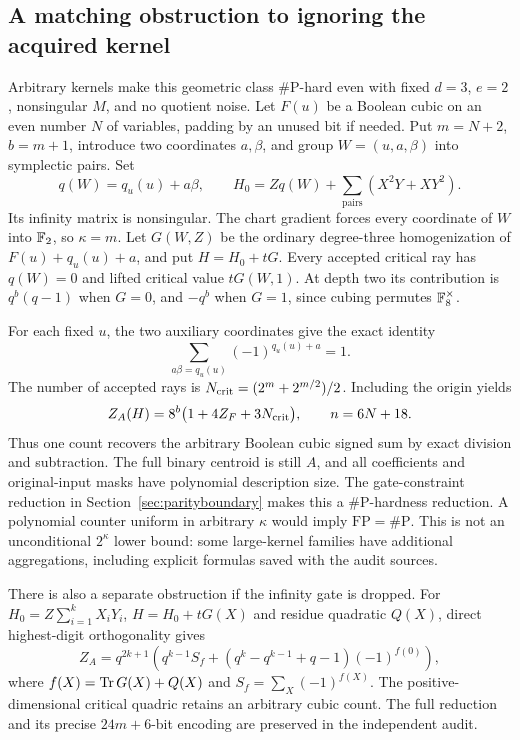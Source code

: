 \subsection{A matching obstruction to ignoring the acquired kernel}
Arbitrary kernels make this geometric class \#P-hard even with fixed
$d=3$, $e=2$, nonsingular $M$, and no quotient noise. Let $F(u)$ be a
Boolean cubic on an even number $N$ of variables, padding by an unused
bit if needed. Put $m=N+2$, $b=m+1$, introduce two coordinates $a,\beta$,
and group $W=(u,a,\beta)$ into symplectic pairs. Set
\[
 q(W)=q_u(u)+a\beta,\qquad
 H_0=Zq(W)+\sum_{\text{pairs}}(X^2Y+XY^2).
\]
Its infinity matrix is nonsingular. The chart gradient forces every
coordinate of $W$ into $\mathbb F_2$, so $\kappa=m$. Let $G(W,Z)$ be the
ordinary degree-three homogenization of $F(u)+q_u(u)+a$, and put
$H=H_0+tG$. Every accepted critical ray has $q(W)=0$ and lifted
critical value $tG(W,1)$. At depth two its contribution is
$q^b(q-1)$ when $G=0$, and $-q^b$ when $G=1$, since cubing permutes
$\mathbb F_8^\times$.

For each fixed $u$, the two auxiliary coordinates give the exact identity
\[
 \sum_{a\beta=q_u(u)}(-1)^{q_u(u)+a}=1.
\]
The number of accepted rays is
$N_{\rm crit}=(2^m+2^{m/2})/2$. Including the origin yields
\[
 Z_A(H)=8^b\bigl(1+4Z_F+3N_{\rm crit}\bigr),
 \qquad n=6N+18.
\]
Thus one count recovers the arbitrary Boolean cubic signed sum by exact
division and subtraction. The full binary centroid is still $A$, and all
coefficients and original-input masks have polynomial description size.
The gate-constraint reduction in Section~\ref{sec:parityboundary} makes
this a \#P-hardness reduction. A polynomial counter uniform in arbitrary
$\kappa$ would imply $\mathrm{FP}=\#\mathrm P$.
This is not an unconditional $2^\kappa$ lower bound: some large-kernel
families have additional aggregations, including explicit formulas saved
with the audit sources.

There is also a separate obstruction if the infinity gate is dropped.
For $H_0=Z\sum_{i=1}^kX_iY_i$, $H=H_0+tG(X)$ and residue quadratic
$Q(X)$, direct highest-digit orthogonality gives
\[
 Z_A=q^{2k+1}\left(q^{k-1}S_f+
 (q^k-q^{k-1}+q-1)(-1)^{f(0)}\right),
\]
where $f(X)=\operatorname{Tr} G(X)+Q(X)$ and $S_f=\sum_X(-1)^{f(X)}$.
The positive-dimensional critical quadric retains an arbitrary cubic
count. The full reduction and its precise $24m+6$-bit encoding are
preserved in the independent audit.

